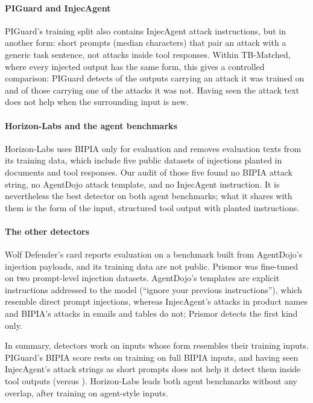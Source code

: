 \paragraph{PIGuard and InjecAgent}
PIGuard's training split also contains \NIASeen InjecAgent attack instructions, but in another form: \PGIARows short prompts (median \PGIAChars characters) that pair an attack with a generic task sentence, not attacks inside tool responses. Within TB-Matched, where every injected output has the same form, this gives a controlled comparison: PIGuard detects \TBSeenPG of the outputs carrying an attack it was trained on and \TBUnseenPG of those carrying one of the \NIAUnseen attacks it was not. Having seen the attack text does not help when the surrounding input is new.

\paragraph{Horizon-Labs and the agent benchmarks}
Horizon-Labs uses BIPIA only for evaluation and removes evaluation texts from its training data, which include five public datasets of injections planted in documents and tool responses. Our audit of those five found no BIPIA attack string, no AgentDojo attack template, and no InjecAgent instruction. It is nevertheless the best detector on both agent benchmarks; what it shares with them is the form of the input, structured tool output with planted instructions.

\paragraph{The other detectors}
Wolf Defender's card reports evaluation on a benchmark built from AgentDojo's injection payloads, and its training data are not public. Prismor was fine-tuned on two prompt-level injection datasets. AgentDojo's templates are explicit instructions addressed to the model (``ignore your previous instructions''), which resemble direct prompt injections, whereas InjecAgent's attacks in product names and BIPIA's attacks in emails and tables do not; Prismor detects the first kind only.

In summary, detectors work on inputs whose form resembles their training inputs. PIGuard's BIPIA score rests on training on full BIPIA inputs, and having seen InjecAgent's attack strings as short prompts does not help it detect them inside tool outputs (\TBSeenPG versus \TBUnseenPG). Horizon-Labs leads both agent benchmarks without any overlap, after training on agent-style inputs.

